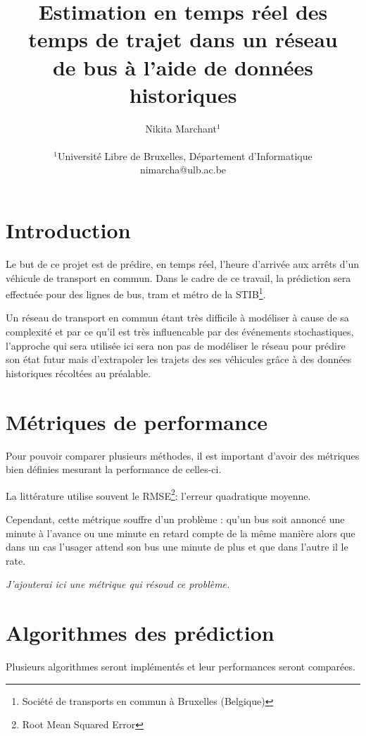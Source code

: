 \documentclass[letterpaper]{article}
\title{Estimation en temps réel des temps de trajet dans un réseau\\ de bus à l'aide de données historiques}
\author{Nikita Marchant$^{1}$\\
\mbox{}\\
$^1$Université Libre de Bruxelles, Département d'Informatique\\
nimarcha@ulb.ac.be}
\begin{document}
\maketitle

\begin{abstract}

\end{abstract}

\section{Introduction}

Le but de ce projet est de prédire, en temps réel, l'heure d'arrivée aux arrêts d'un véhicule de transport en commun.
Dans le cadre de ce travail, la prédiction sera effectuée pour des lignes de bus,
tram et métro de la STIB\footnote{Société de transports en commun à Bruxelles (Belgique)}.

Un réseau de transport en commun étant très difficile à modéliser à cause de sa complexité et par ce qu'il est très influencable par des événements stochastiques,
l'approche qui sera utilisée ici sera non pas de modéliser le réseau pour prédire son état futur mais d'extrapoler les trajets des ses véhicules grâce à des données historiques récoltées au préalable.

\section{Métriques de performance}

Pour pouvoir comparer plusieurs méthodes,
il est important d'avoir des métriques bien définies mesurant la performance de celles-ci.

La littérature utilise souvent le RMSE\footnote{Root Mean Squared Error}: l'erreur quadratique moyenne.

Cependant, cette métrique souffre d'un problème :
qu'un bus soit annoncé une minute à l'avance ou une minute en retard compte de la même manière alors que dans un cas l'usager attend son bus une minute de plus et que dans l'autre il le rate.

\textit{J'ajouterai ici une métrique qui résoud ce problème.}

\section{Algorithmes des prédiction}
Plusieurs algorithmes seront implémentés et leur performances seront comparées.
\end{document}
